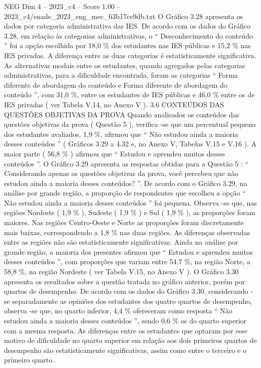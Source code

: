 \begin{textsample}{NEG Dim 4 – 2023\_c4 – Score 1.00 – 2023\_c4/enade\_2023\_eng\_mec\_63b17ce9db.txt}
O Gráfico 3.28 apresenta os dados por categoria administrativa das IES.
De acordo com os dados do Gráfico 3.28, em relação às categorias administrativas, o “ Desconhecimento do conteúdo ” foi a opção escolhida por 18,0 \% dos estudantes nas IES públicas e 15,2 \% nas IES privadas.
A diferença entre as duas categorias é estatisticamente significativa.
As alternativas modais entre os estudantes, quando agregados pelas categorias administrativas, para a dificuldade encontrada, foram as categorias “ Forma diferente de abordagem do conteúdo e Forma diferente de abordagem do conteúdo ”, com 31,0 \%, entre os estudantes de IES públicas e 46,0 \% entre os de IES privadas ( ver Tabela V.14, no Anexo V ). 3.6 CONTEÚDOS DAS QUESTÕES OBJETIVAS DA PROVA Quando analisados os conteúdos das questões objetivas da prova ( Questão 5 ), verifica -se que um percentual pequeno dos estudantes avaliados, 1,9 \%, afirmou que “ Não estudou ainda a maioria desses conteúdos ” ( Gráficos 3.29 a 4.32 e, no Anexo V, Tabelas V.15 e V.16 ).
A maior parte ( 56,8 \% ) afirmou que “ Estudou e aprendeu muitos desses conteúdos ”.
O Gráfico 3.29 apresenta as respostas obtidas para a Questão 5 : “ Considerando apenas as questões objetivas da prova, você percebeu que não estudou ainda a maioria desses conteúdos? ”.
De acordo com o Gráfico 3.29, na análise por grande região, a proporção de respondentes que escolheu a opção “ Não estudou ainda a maioria desses conteúdos ” foi pequena.
Observa -se que, nas regiões Nordeste ( 1,9 \% ), Sudeste ( 1,9 \% ) e Sul ( 1,9 \% ), as proporções foram maiores.
Nas regiões Centro-Oeste e Norte as proporções foram discretamente mais baixas, correspondendo a 1,8 \% nas duas regiões.
As diferenças observadas entre as regiões não são estatisticamente significativas.
Ainda na análise por grande região, a maioria dos presentes afirmou que “ Estudou e aprendeu muitos desses conteúdos ”, com proporções que variam entre 54,7 \%, na região Norte, a 58,8 \%, na região Nordeste ( ver Tabela V.15, no Anexo V ).
O Gráfico 3.30 apresenta os resultados sobre a questão tratada no gráfico anterior, porém por quartos de desempenho.
De acordo com os dados do Gráfico 3.30, considerando -se separadamente as opiniões dos estudantes dos quatro quartos de desempenho, observa -se que, no quarto inferior, 4,4 \% ofereceram como resposta “ Não estudou ainda a maioria desses conteúdos ”, sendo 0,6 \% os do quarto superior com a mesma resposta.
As diferenças entre os estudantes que optaram por esse motivo de dificuldade no quarto superior em relação aos dois primeiros quartos de desempenho são estatisticamente significativas, assim como entre o terceiro e o primeiro quarto.

\end{textsample}
